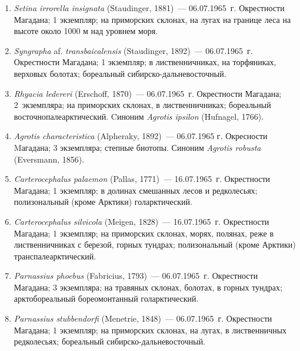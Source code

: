 \begin{enumerate}[noitemsep, leftmargin=0cm]

      \item \textit{Setina irrorella insignata} (Staudinger, 1881)~--- 06.07.1965~г. Окрестности Магадана; 1 экземпляр; на приморских склонах, на лугах на границе леса на высоте около 1000 м над уровнем моря.


      \item \textit{Syngrapha} af. \textit{transbaicalensis} (Staudinger, 1892)~--- 06.07.1965~г. Окрестности Магадана; 1 экземпляр; в лиственничниках, на торфяниках, верховых болотах; бореальный сибирско-дальневосточный.

      \item \textit{Rhyacia ledereri} (Erschoff, 1870)~--- 06.07.1965~г. Окрестности Магадана; 2~экземпляра; на приморских склонах, в лиственничниках; бореальный восточнопалеарктический. Cиноним \textit{Agrotis ipsilon} (Hufnagel, 1766).

      \item \textit{Agrotis characteristica} (Alpheraky, 1892)~--- 06.07.1965 г. Окресности Mагадана; 3 экземпляра; степные биотопы. Синоним \textit{Agrotis robusta} (Eversmann, 1856).


      \item \textit{Carterocephalus palaemon} (Pallas, 1771)~--- 16.07.1965~г. Окрестности Магадана; 1 экземпляр; в долинах смешанных лесов и редколесьях; полизональный (кроме Арктики) голарктический.

      \item \textit{Carterocephalus silvicola} (Meigen, 1828)~--- 16.07.1965~г. Окрестности Магадана; 1 экземпляр; на приморских склонах, морях, полянах, реже в лиственничниках с березой, горных тундрах; полизональный (кроме Арктики) транспалеарктический.


      \item \textit{Parnassius phoebus} (Fabricius, 1793)~--- 06.07.1965~г. Окрестности Магадана; 3 экземпляра; на травяных склонах, болотах, в горных тундрах; арктобореальный бореомонтанный голарктический.

    \item \textit{Parnassius stubbendorfi} (Menetrie, 1848)~--- 06.07.1965~г. Окрестности Магадана; 1 экземпляр; на приморских склонах, на лугах, в лиственничных редколесьях; бореальный сибирско-дальневосточный.


\end{enumerate}
